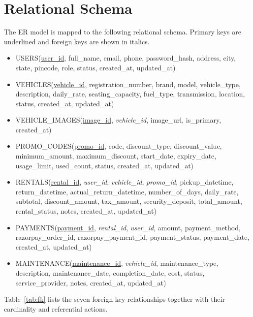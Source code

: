 \documentclass[10pt,a4paper]{report}
\begin{document}
\section{Relational Schema}
The ER model is mapped to the following relational schema. Primary keys are underlined and foreign keys are shown in italics.
\begin{itemize}
  \item USERS(\underline{user\_id}, full\_name, email, phone, password\_hash, address, city, state, pincode, role, status, created\_at, updated\_at)
  \item VEHICLES(\underline{vehicle\_id}, registration\_number, brand, model, vehicle\_type, description, daily\_rate, seating\_capacity, fuel\_type, transmission, location, status, created\_at, updated\_at)
  \item VEHICLE\_IMAGES(\underline{image\_id}, \textit{vehicle\_id}, image\_url, is\_primary, created\_at)
  \item PROMO\_CODES(\underline{promo\_id}, code, discount\_type, discount\_value, minimum\_amount, maximum\_discount, start\_date, expiry\_date, usage\_limit, used\_count, status, created\_at, updated\_at)
  \item RENTALS(\underline{rental\_id}, \textit{user\_id}, \textit{vehicle\_id}, \textit{promo\_id}, pickup\_datetime, return\_datetime, actual\_return\_datetime, number\_of\_days, daily\_rate, subtotal, discount\_amount, tax\_amount, security\_deposit, total\_amount, rental\_status, notes, created\_at, updated\_at)
  \item PAYMENTS(\underline{payment\_id}, \textit{rental\_id}, \textit{user\_id}, amount, payment\_method, razorpay\_order\_id, razorpay\_payment\_id, payment\_status, payment\_date, created\_at, updated\_at)
  \item MAINTENANCE(\underline{maintenance\_id}, \textit{vehicle\_id}, maintenance\_type, description, maintenance\_date, completion\_date, cost, status, service\_provider, notes, created\_at, updated\_at)
\end{itemize}

Table~\ref{tab:fk} lists the seven foreign-key relationships together with their cardinality and referential actions.
\end{document}
